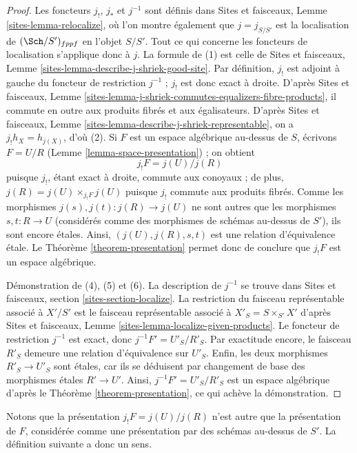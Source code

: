 \begin{proof}
Les foncteurs $j_!$, $j_*$ et $j^{-1}$ sont définis dans
Sites et faisceaux, Lemme \ref{sites-lemma-relocalize},
où l'on montre également que $j = j_{S/S'}$ est la localisation
de $(\Sch/S')_{fppf}$ en l'objet $S/S'$. Tout ce qui concerne
les foncteurs de localisation s'applique donc à $j$.
La formule de (1) est celle de
Sites et faisceaux, Lemme \ref{sites-lemma-describe-j-shriek-good-site}.
Par définition, $j_!$ est adjoint à gauche du foncteur de restriction $j^{-1}$ ;
$j_!$ est donc exact à droite. D'après
Sites et faisceaux, Lemme \ref{sites-lemma-j-shriek-commutes-equalizers-fibre-products},
il commute en outre aux produits fibrés et aux égalisateurs.
D'après
Sites et faisceaux, Lemme \ref{sites-lemma-describe-j-shriek-representable},
on a $j_!h_X = h_{j(X)}$, d'où (2).
Si $F$ est un espace algébrique au-dessus de $S$, écrivons $F = U/R$
(Lemme \ref{lemma-space-presentation}) ;
on obtient
$$
j_!F = j(U)/j(R)
$$
puisque $j_!$, étant exact à droite, commute aux conoyaux ; de plus,
$j(R) = j(U) \times_{j_!F} j(U)$ puisque $j_!$ commute aux produits fibrés.
Comme les morphismes $j(s), j(t) : j(R) \to j(U)$ ne sont autres que les morphismes
$s, t : R \to U$ (considérés comme des morphismes de schémas au-dessus de $S'$), ils
sont encore \'etales. Ainsi, $(j(U), j(R), s, t)$ est une relation d'équivalence \'etale.
Le
Théorème \ref{theorem-presentation}
permet donc de conclure que $j_!F$ est un espace algébrique.

\medskip\noindent
Démonstration de (4), (5) et (6). La description de $j^{-1}$ se trouve dans
Sites et faisceaux, section \ref{sites-section-localize}.
La restriction du faisceau représentable associé à $X'/S'$
est le faisceau représentable associé à
$X'_S = S \times_{S'} X'$ d'après
Sites et faisceaux, Lemme \ref{sites-lemma-localize-given-products}.
Le foncteur de restriction $j^{-1}$ est exact, donc $j^{-1}F' = U'_S/R'_S$.
Par exactitude encore, le faisceau $R'_S$ demeure une relation d'équivalence sur
$U'_S$. Enfin, les deux morphismes $R'_S \to U'_S$ sont \'etales, car ils se
déduisent par changement de base des morphismes \'etales $R' \to U'$. Ainsi,
$j^{-1}F' = U'_S/R'_S$ est un espace algébrique d'après le
Théorème \ref{theorem-presentation},
ce qui achève la démonstration.
\end{proof}

\noindent
Notons que la présentation $j_!F = j(U)/j(R)$ n'est autre que la présentation
de $F$, considérée comme une présentation par des schémas au-dessus de $S'$.
La définition suivante a donc un sens.

